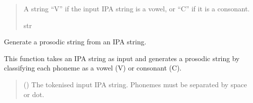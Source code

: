 \documentclass[letterpaper,10pt,english]{sphinxmanual}
\begin{document}
\begin{fulllineitems}
\begin{fulllineitems}
\begin{quote}
\begin{description}
\sphinxAtStartPar
A string “V” if the input IPA string is a vowel, or “C” if it
is a consonant.

\sphinxAtStartPar
str

\end{description}\end{quote}

\sphinxAtStartPar
{}

\begin{sphinxVerbatim}[commandchars=\\\{\}]
   
  
\end{sphinxVerbatim}

\end{fulllineitems}


\begin{fulllineitems}
\label{\detokenize{documentation:loanpy.utils.IPA.get_prosody}}
\pysigstartsignatures
{}
\pysigstopsignatures
\sphinxAtStartPar
Generate a prosodic string from an IPA string.

\sphinxAtStartPar
This function takes an IPA string as input and generates a prosodic
string by classifying each phoneme as a vowel (V) or consonant (C).
\begin{quote}\begin{description}
\sphinxAtStartPar
{} () \textendash{} The tokenised input IPA string. Phonemes must be
separated by space or dot.


\end{description}
\end{quote}
\end{fulllineitems}
\end{fulllineitems}
\end{document}
